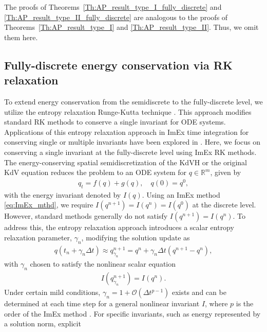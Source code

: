 \documentclass{article}
\begin{document}
The proofs of Theorems~\ref{Th:AP_result_type_I_fully_discrete} and
\ref{Th:AP_result_type_II_fully_discrete} are analogous to the proofs of
Theorems~\ref{Th:AP_result_type_I} and \ref{Th:AP_result_type_II}. Thus,
we omit them here.

\subsection{Fully-discrete energy conservation via RK relaxation}
To extend energy conservation from the semidiscrete to the fully-discrete level,
we utilize the entropy relaxation Runge-Kutta technique \cite{ketcheson2019relaxation,ranocha2020relaxation,ranocha2020general}.
This approach modifies standard RK methods
to conserve a single invariant for ODE systems. Applications of this entropy relaxation approach in ImEx time integration for
conserving single or multiple invariants have been explored in
\cite{biswas2023accurate,biswas2023multiple,li2022implicit}.
Here, we focus on conserving a single invariant at the fully-discrete level using ImEx RK methods.
The energy-conserving spatial semidiscretization of the KdVH or the original KdV equation reduces the problem to an
ODE system for $q \in \mathbb{R}^{m}$, given by
\begin{align*}
  q_t = f(q) + g(q), \quad q(0) = q^0,
\end{align*}
with the energy invariant denoted by $I(q)$.
Using an ImEx method \eqref{eq:ImEx_mthd}, we require $I(q^{n+1}) = I(q^n) = I(q^0)$
at the discrete level.
However, standard methods generally do not satisfy $I(q^{n+1}) = I(q^n)$.
To address this, the entropy relaxation approach introduces
a scalar entropy relaxation parameter, $\gamma_n$, modifying the solution update as
\begin{align*}
    q(t_n + \gamma_n \Delta t)
    \approx
    q^{n+1}_{\gamma_n}
    =
    q^n + \gamma_n \Delta t \left( q^{n+1} - q^{n} \right),
\end{align*}
with $\gamma_n$ chosen to satisfy the nonlinear scalar equation
\begin{align*}
I(q^{n+1}_{\gamma_n}) = I(q^n).
\end{align*}
Under certain mild conditions, $\gamma_n = 1 + \mathcal{O}(\Delta t^{p-1})$
exists and can be determined at each time step for a general nonlinear
invariant $I$, where $p$ is the order of the ImEx method
\cite{ketcheson2019relaxation,ranocha2020general}.
For specific invariants, such as energy represented by a solution norm, explicit
\end{document}
